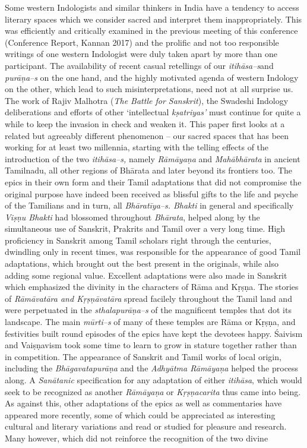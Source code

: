 Some western Indologists and similar thinkers in India have a tendency to access literary spaces which we consider sacred and interpret them inappropriately. This was efficiently and critically examined in the previous meeting of this conference (Conference Report, Kannan 2017) and the prolific and not too responsible writings of one western Indologist were duly taken apart by more than one participant. The availability of recent casual retellings of our \textit{itihāsa–s}\break and \textit{purāņa–s} on the one hand, and the highly motivated agenda of western Indology on the other, which lead to such misinterpretations, need not at all surprise us. The work of Rajiv Malhotra (\textit{The Battle for Sanskrit}), the Swadeshi Indology deliberations and efforts of other ‘intellectual \textit{kṣatriyas’} must continue for quite a while to keep the invasion in check and weaken it. This paper first looks at a related but agreeably different phenomenon – our sacred spaces that has been working for at least two millennia, starting with the telling effects of the introduction of the two \textit{itihāsa–s,} namely \textit{Rāmāyaṇa} and \textit{Mahābhārata} in ancient Tamilnadu, all other regions of Bhārata and later beyond its frontiers too. The epics in their own form and their Tamil adaptations that did not compromise the original purpose have indeed been received as blissful gifts to the life and psyche of the Tamilians and in turn, all \textit{Bhāratīya–s. Bhakti} in general and specifically \textit{Viṣṇu Bhakti} had blossomed throughout \textit{Bhārata}, helped along by the simultaneous use of Sanskrit, Prakrits and Tamil over a very long time. High proficiency in Sanskrit among Tamil scholars right through the centuries, dwindling only in recent times, was responsible for the appearance of good Tamil adaptations, which brought out the best present in the originals, while also adding some regional value. Excellent adaptations were also made in Sanskrit which emphasized the divinity in the characters of Rāma and Kṛṣṇa. The stories of \textit{Rāmāvatāra and Kṛṣṇāvatāra} spread facilely throughout the Tamil land and were perpetuated in the \textit{sthalapurāṇa–s} of the magnificent temples that dot its landscape. The main \textit{mūrti–s} of many of these temples are Rāma or Kṛṣṇa, and festivities built round episodes of the epics have kept the devotees happy. Śaivism and Vaiṣṇavism took some time to learn to grow in stature together rather than in competition. The appearance of Sanskrit and Tamil works of local origin, including the \textit{Bhāgavatapurāṇa} and the \textit{Adhyātma Rāmāyaņa} helped the process along. A \textit{Sanātanic} specification for any adaptation of either \textit{itihāsa}, which would seek to be recognized as another \textit{Rāmāyaṇa} or \textit{Kṛṣṇacarita} thus came into being. As against this, other adaptations of the epics as well as commentaries have appeared more recently, some of which could be appreciated as interesting cultural and literary variations and read or studied for pleasure and research. Many however, which did not reinforce the recognition of the two divine 